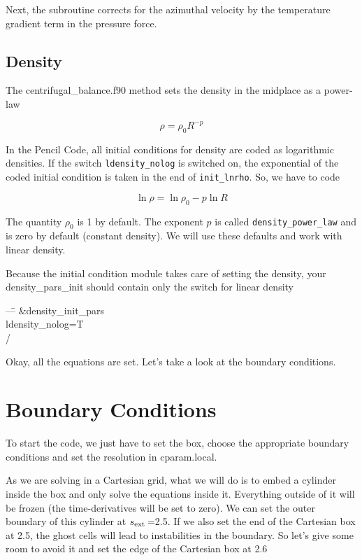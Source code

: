 \documentclass[a4paper,10pt]{article}
\newcommand{\pencilcode}{{\sc Pencil Code}}
\newcommand{\rext}{$s_{\rm ext}\,$}
\begin{document}
Next, the subroutine corrects for the azimuthal velocity by the temperature gradient term in the pressure force. 

\subsection{Density}

The centrifugal\_balance.f90 method sets the density in the midplace as a power-law

\begin{equation}
\label{density}
 \rho = \rho_0 R^{-p}
\end{equation}

In the \pencilcode, all initial conditions for density are coded as logarithmic densities. If the switch {\tt ldensity\_nolog} is switched on, the exponential of the coded initial condition is taken in the end of {\tt init\_lnrho}. So, we have to code 

\begin{equation}
\ln \rho = \ln \rho_0 - p \ln R
\end{equation}

The quantity $\rho_0$ is 1 by default. The exponent $p$ is called {\tt density\_power\_law} and is zero by default (constant density). We will use these defaults and work with linear density. 

Because the initial condition module takes care of setting the
density, your density\_pars\_init should contain only the switch for
linear density

{\tt \begin{tabbing}
  ---\=\kill
\&density\_init\_pars\\
  \>ldensity\_nolog=T\\
/
\end{tabbing}}

Okay, all the equations are set. Let's take a look at the boundary conditions.

\section{Boundary Conditions}

To start the code, we just have to set the box, choose the appropriate boundary conditions and set the resolution in cparam.local. 

As we are solving in a Cartesian grid, what we will do is to embed a cylinder inside the box and only solve the equations inside it. Everything outside of it will be frozen (the time-derivatives will be set to zero). We can set the outer boundary of this cylinder at \rext=2.5. If we also set the end of the Cartesian box at 2.5, the ghost cells will lead to instabilities in the boundary. So let's give some room to avoid it and set the edge of the Cartesian box at 2.6
\end{document}
